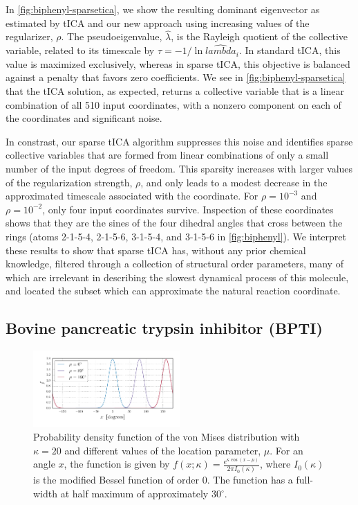 \documentclass[aip, jcp, reprint, nolinenumbers, twocolumn, nobalancelastpage, nofootinbib]{revtex4-1}
\begin{document}
In \cref{fig:biphenyl-sparsetica}, we show the resulting dominant eigenvector as estimated by tICA and our new approach using increasing values of the regularizer, $\rho$. The pseudoeigenvalue, $\hat{\lambda}$, is the Rayleigh quotient of the collective variable, related to its timescale by $\hat{\tau}=-1/ \ln \hat{lambda}_i$. In standard tICA, this value is maximized exclusively, whereas in sparse tICA, this objective is balanced against a penalty that favors zero coefficients. We see in \cref{fig:biphenyl-sparsetica} that the tICA solution, as expected, returns a collective variable that is a linear  combination of all 510 input coordinates, with a nonzero component on each of the coordinates and significant noise.

In constrast, our sparse tICA algorithm suppresses this noise and identifies sparse collective variables that are formed from linear combinations of only a small number of the input degrees of freedom. This sparsity increases with larger values of the regularization strength, $\rho$, and only leads to a modest decrease in the approximated timescale associated with the coordinate. For $\rho=10^{-3}$ and $\rho=10^{-2}$, only four input coordinates survive. Inspection of these coordinates shows that they are the sines of the four dihedral angles that cross between the rings (atoms 2-1-5-4, 2-1-5-6, 3-1-5-4, and 3-1-5-6 in \cref{fig:biphenyl}). We interpret these results to show that sparse tICA has, without any prior chemical knowledge, filtered through a collection of structural order parameters, many of which are irrelevant in describing the slowest dynamical process of this molecule, and located the subset which can approximate the natural reaction coordinate.


\subsection{Bovine pancreatic trypsin inhibitor (BPTI)}

\begin{figure}
    \centering
    \includegraphics[width=0.5\textwidth]{von-mises-crop.pdf}
    \caption{\label{fig:vonmises} Probability density function of the von Mises distribution with $\kappa=20$ and different values of the location parameter, $\mu$. For an angle $x$, the function is given by $f(x;\kappa) = \frac{e^{\kappa \cos(x-\mu)}}{2\pi I_0(\kappa)}$, where $I_0(\kappa)$ is the modified Bessel function of order 0. The function has a full-width at half maximum of approximately $30^\circ$.}
\end{figure}
\end{document}
